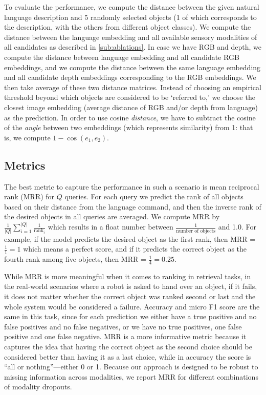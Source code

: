 \documentclass[sigconf,natbib=true,anonymous=true]{acmart}
\begin{document}
To evaluate the performance, we compute the distance between the given natural language description and 5 randomly selected objects (1 of which corresponds to the description, with the others from different object classes). We compute the distance between the language embedding and all available sensory modalities of all candidates as described in \cref{sub:ablations}. In case we have RGB and depth, we compute the distance between language embedding and all candidate RGB embeddings, and we compute the distance between the same language embedding and all candidate depth embeddings corresponding to the RGB embeddings. We then take average of these two distance matrices. Instead of choosing an empirical threshold beyond which objects are considered to be `referred to,' we choose the closest image embedding (average distance of RGB and/or depth from language) as the prediction.
In order to use cosine \textit{distance}, we have to subtract the cosine of the \textit{angle} between two embeddings (which represents similarity) from 1: that is, we compute $1 - \cos(e_1, e_2)$.

\subsection{Metrics}
\label{sec:metrics}
The best metric to capture the performance in such a scenario is mean reciprocal rank (MRR)
for $Q$ queries. 
For each query we predict the rank of all objects based on their distance from the language command, and then the inverse rank of the desired objects in all queries are averaged. We compute MRR by $\frac{1}{|Q|} \sum_{i=1}^{|Q|} \frac{1}{\operatorname{rank}_{i}}$ which results in a float number between $\frac{1}{\text{number of objects}}$ and 1.0. For example, if the model predicts the desired object as the first rank, then MRR = $\frac{1}{1} = 1$ which means a perfect score, and if it predicts the correct object as the fourth rank among five objects, then MRR = $\frac{1}{4}=0.25$. 


While MRR is more meaningful when it comes to ranking in retrieval tasks, in the real-world scenarios where a robot is asked to hand over an object, if it fails, it does not matter whether the correct object was ranked second or last and the whole system would be considered a failure.
Accuracy and micro F1 score
are the same in this task, since for each prediction we either have a true positive and no false positives and no false negatives, or we have no true positives, one false positive and one false negative. MRR is a more informative metric because it captures the idea that having the correct object as the second choice should be considered better than having it as a last choice, while in accuracy the score is ``all or nothing''---either 0 or 1. Because our approach is designed to be robust to missing information across modalities, we report MRR %
for different combinations of modality dropouts. 
\end{document}
